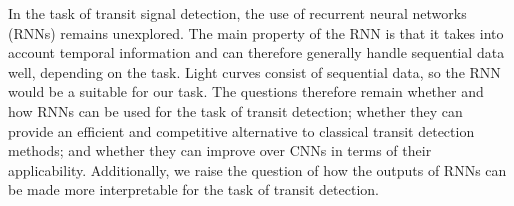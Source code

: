 In the task of transit signal detection, the use of recurrent neural networks (RNNs) remains unexplored. The main property of the RNN is that it takes into account temporal information and can therefore generally handle sequential data well, depending on the task. Light curves consist of sequential data, so the RNN would be a suitable for our task. The questions therefore remain whether and how RNNs can be used for the task of transit detection; whether they can provide an efficient and competitive alternative to classical transit detection methods; and whether they can improve over CNNs in terms of their applicability. Additionally, we raise the question of how the outputs of RNNs can be made more interpretable for the task of transit detection. 

